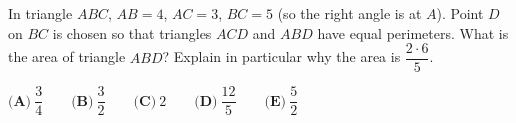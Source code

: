 In triangle $ABC$, $AB=4$, $AC=3$, $BC=5$ (so the right angle is at $A$). Point $D$ on $BC$ is chosen so that triangles $ACD$ and $ABD$ have equal perimeters. What is the area of triangle $ABD$? Explain in particular why the area is $\dfrac{2\cdot6}{5}$.

$\textbf{(A)}\ \dfrac{3}{4}\qquad\textbf{(B)}\ \dfrac{3}{2}\qquad\textbf{(C)}\ 2\qquad\textbf{(D)}\ \dfrac{12}{5}\qquad\textbf{(E)}\ \dfrac{5}{2}$
